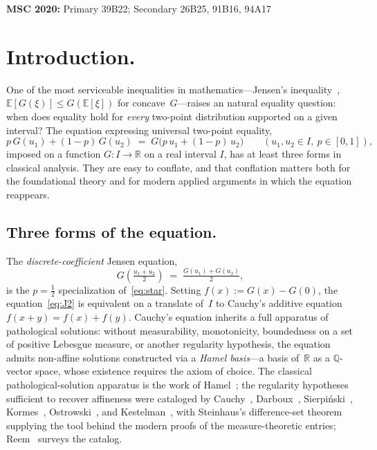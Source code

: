 \documentclass{article}
\theoremstyle{plain}
\theoremstyle{definition}
\newcommand{\R}{\mathbb{R}}
\newcommand{\Q}{\mathbb{Q}}
\newcommand{\E}{\mathbb{E}}
\begin{document}
\vspace{4px}

\noindent\textbf{MSC 2020:} Primary 39B22; Secondary 26B25, 91B16, 94A17

\vspace{8px}

\section{Introduction.}
\label{sec:intro}

One of the most serviceable inequalities in mathematics---Jensen's
inequality~\cite{Jensen1906}, $\E[G(\xi)]\le G(\E[\xi])$ for concave~$G$---raises an
natural equality question: when does equality hold for \emph{every} two-point
distribution supported on a given interval? The equation expressing
universal two-point equality,
\begin{equation}
p\,G(u_1)+(1-p)\,G(u_2) \;=\; G\bigl(p\,u_1+(1-p)\,u_2\bigr)
\qquad (u_1,u_2\in I,\ p\in[0,1]),
\tag{$\star$}\label{eq:star}
\end{equation}
imposed on a function $G\colon I\to\R$ on a real interval $I$, has
at least three forms in classical analysis. They are easy to conflate, and that conflation matters both for the foundational theory and for modern applied arguments in which the equation reappears.

\subsection{Three forms of the equation.}

The \emph{discrete-coefficient} Jensen equation,
\begin{equation}
G\!\left(\tfrac{u_1+u_2}{2}\right) \;=\; \tfrac{G(u_1)+G(u_2)}{2},
\tag{$J_2$}\label{eq:J2}
\end{equation}
is the $p=\tfrac{1}{2}$ specialization of~\eqref{eq:star}. Setting
$f(x):=G(x)-G(0)$, the equation~\eqref{eq:J2} is equivalent on a
translate of~$I$ to Cauchy's additive equation $f(x+y)=f(x)+f(y)$.
Cauchy's equation inherits a full apparatus of pathological solutions:
without measurability, monotonicity, boundedness on a set of positive
Lebesgue measure, or another regularity hypothesis, the equation admits
non-affine solutions constructed via a \emph{Hamel basis}---a basis
of~$\R$ as a $\Q$-vector space, whose existence requires the axiom of
choice. The classical pathological-solution apparatus is the work of
Hamel~\cite{Hamel1905}; the regularity hypotheses sufficient to recover
affineness were cataloged by Cauchy~\cite{Cauchy1821},
Darboux~\cite{Darboux1875,Darboux1880}, Sierpi\'nski~\cite{Sierpinski1920},
Kormes~\cite{Kormes1926}, Ostrowski~\cite{Ostrowski1929}, and
Kestelman~\cite{Kestelman1947}, with Steinhaus's difference-set
theorem~\cite{Steinhaus1920} supplying the tool behind the modern
proofs of the measure-theoretic entries; Reem~\cite{Reem2017} surveys
the catalog.
\end{document}

